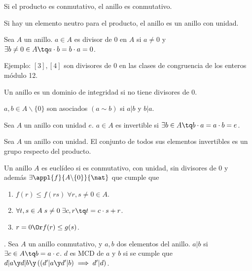 \documentclass[nochap]{apuntes}
\begin{document}
\begin{defn} Si el producto es conmutativo, el anillo es conmutativo.\end{defn}

\begin{defn} Si hay un elemento neutro para el producto, el anillo es un anillo con unidad.\end{defn}

\begin{defn}[Divisores de 0] Sea $A$ un anillo. $a\in A$ es divisor de 0 en $A$ si $a\neq 0$ y $\exists b\neq 0 \in A \tq a\cdot b=b\cdot a =0$. 

Ejemplo: $[3], [4]$ son divisores de 0 en las clases de congruencia de los enteros módulo 12.\end{defn}

\begin{defn} Un anillo es un dominio de integridad si no tiene divisores de 0.\end{defn}

\begin{defn}[Asociados] $a, b\in A \backslash \{0\}$ son asociados $(a\sim b)$ si $a|b$ y $b|a$. \end{defn}

\begin{defn} Sea $A$ un anillo con unidad $e$. $a\in A$ es invertible si $\exists b \in A \tq b\cdot a = a\cdot b = e$.\end{defn}

\begin{lemma}Sea $A$ un anillo con unidad. El conjunto de todos sus elementos invertibles es un grupo respecto del producto.\end{lemma}

\begin{defn} Un anillo $A$ es euclídeo si es conmutativo, con unidad, sin divisores de 0 y además $\exists  \appl{f}{A \backslash \{0\}}{\nat}$ que cumple que \begin{enumerate}
\item $f(r)\leq f(rs) \; \forall r,s\neq 0 \in A$.
\item $\forall t,s\in A \; s\neq 0 \; \exists c,r \tq t=c\cdot s +r$.
\item $r=0 \Or f(r)\leq g(s)$.
\end{enumerate}
\end{defn}

\begin{defn}. Sea $A$ un anillo conmutativo, y $a,b$ dos elementos del anillo. $a|b$ si $\exists c\in A \tq b=a\cdot c$. $d$ es MCD de $a$ y $b$ si se cumple que $d|a \y d|b \y \left((d'|a \y d'|b)\implies d'|d\right)$.\end{defn}
\end{document}
